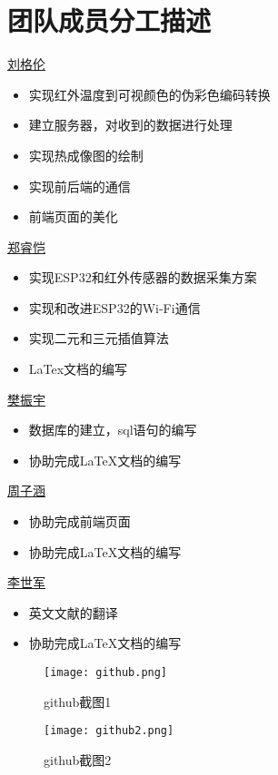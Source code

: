 \chapter{团队成员分工描述}

\underline{刘格伦}
\begin{itemize}
    \item 实现红外温度到可视颜色的伪彩色编码转换
    \item 建立服务器，对收到的数据进行处理
    \item 实现热成像图的绘制
    \item 实现前后端的通信
    \item 前端页面的美化
    \end{itemize}

\underline{郑睿恺}
\begin{itemize}
    \item 实现ESP32和红外传感器的数据采集方案
    \item 实现和改进ESP32的Wi-Fi通信
    \item 实现二元和三元插值算法
    \item LaTex文档的编写
    \end{itemize}

\underline{樊振宇}
\begin{itemize}
    \item 数据库的建立，sql语句的编写
    \item 协助完成LaTeX文档的编写
    \end{itemize}
    
    \underline{周子涵}
\begin{itemize}
    \item 协助完成前端页面
    \item 协助完成LaTeX文档的编写
    \end{itemize}
    
    \underline{李世军}
\begin{itemize}
    \item 英文文献的翻译
    \item 协助完成LaTeX文档的编写
    \end{itemize}

    \begin{figure}[htbp]
        \centering
        \texttt{[image: github.png]}
        \caption{github截图1}\label{fig:github}
        \vspace{\baselineskip}
        \end{figure}
        \begin{figure}[htbp]
            \centering
            \texttt{[image: github2.png]}
            \caption{github截图2}\label{fig:github2}
            \vspace{\baselineskip}
            \end{figure}








